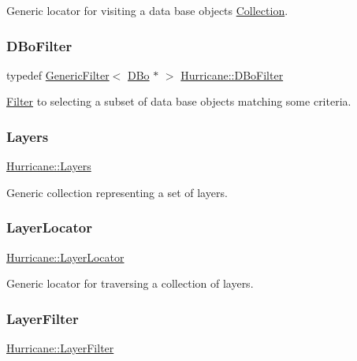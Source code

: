 Generic locator for visiting a data base objects \hyperlink{classHurricane_1_1Collection}{Collection}. \mbox{\label{namespaceHurricane_a2af87173f0c45c5dc1f504d3ea2317d9}} 
\subsubsection{\texorpdfstring{D\+Bo\+Filter}{DBoFilter}}
{\footnotesize\ttfamily typedef \hyperlink{classHurricane_1_1GenericFilter}{Generic\+Filter}$<$ \hyperlink{classHurricane_1_1DBo}{D\+Bo} $\ast$ $>$ \hyperlink{namespaceHurricane_a2af87173f0c45c5dc1f504d3ea2317d9}{Hurricane\+::\+D\+Bo\+Filter}}

\hyperlink{classHurricane_1_1Filter}{Filter} to selecting a subset of data base objects matching some criteria. \mbox{\label{namespaceHurricane_a7b7200a36ab7ce8a157ddbe78b625f38}} 
\subsubsection{\texorpdfstring{Layers}{Layers}}
{\footnotesize\ttfamily \hyperlink{namespaceHurricane_a7b7200a36ab7ce8a157ddbe78b625f38}{Hurricane\+::\+Layers}}

Generic collection representing a set of layers. \mbox{\label{namespaceHurricane_a91a93ea29be3e6658d72f9bee0da8c7b}} 
\subsubsection{\texorpdfstring{Layer\+Locator}{LayerLocator}}
{\footnotesize\ttfamily \hyperlink{namespaceHurricane_a91a93ea29be3e6658d72f9bee0da8c7b}{Hurricane\+::\+Layer\+Locator}}

Generic locator for traversing a collection of layers. \mbox{\label{namespaceHurricane_a150e0e72c5c5609e0feb3311fa5bc127}} 
\subsubsection{\texorpdfstring{Layer\+Filter}{LayerFilter}}
{\footnotesize\ttfamily \hyperlink{namespaceHurricane_a150e0e72c5c5609e0feb3311fa5bc127}{Hurricane\+::\+Layer\+Filter}}

